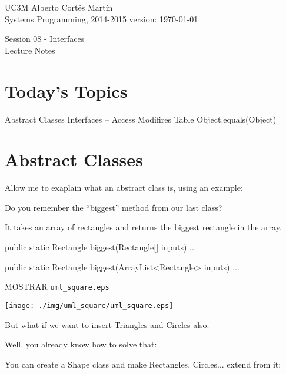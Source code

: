 \documentclass[a4paper, 9pt]{extarticle}
\newcommand{\realtitle}{Session 08 - Interfaces}
\begin{document}
\makebox[\linewidth]{\rule{\textwidth}{0.4pt}}
UC3M \hfill Alberto Cortés Martín\\
Systems Programming, 2014-2015 \hfill version: \today\\
\makebox[\linewidth]{\rule{\textwidth}{0.4pt}}
\begin{center}
  \Large{\realtitle}\\Lecture Notes
\end{center}
\makebox[\linewidth]{\rule{\textwidth}{0.4pt}}
\vspace{1cm}


\section{Today's Topics}
\begin{blackboard}
Abstract Classes
Interfaces
--
Access Modifires Table
Object.equals(Object)
\end{blackboard}










\section{Abstract Classes}

Allow me to exaplain what an abstract class is, using an example:

Do you remember the ``biggest'' method from our last class?

It takes an array of rectangles and returns the biggest rectangle in the array.

\begin{blackboard}
  public static Rectangle biggest(Rectangle[] inputs) {
    ...
  }

  public static Rectangle biggest(ArrayList<Rectangle> inputs) {
    ...
  }
\end{blackboard}

MOSTRAR \verb+uml_square.eps+
\begin{center}
  \texttt{[image: ./img/uml\_square/uml\_square.eps]}
\end{center}

But what if we want to insert Triangles and Circles also.

Well, you already know how to solve that:

You can create a Shape class and make Rectangles, Circles... extend from it:
\end{document}
